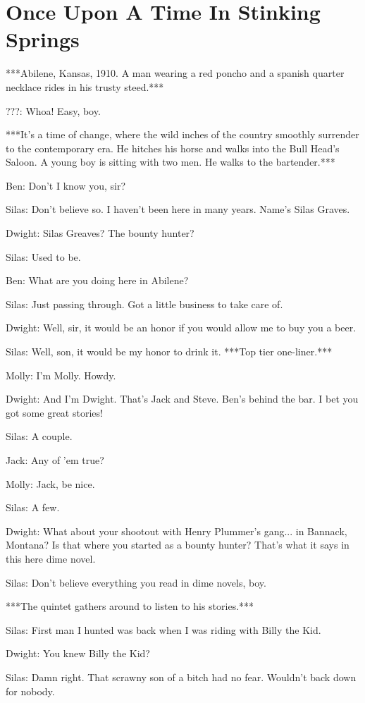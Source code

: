 \documentclass{article}
\begin{document}
\section*{Once Upon A Time In Stinking Springs}

***Abilene, Kansas, 1910. A man wearing a red poncho and a spanish quarter necklace rides in his trusty steed.***

???: Whoa! Easy, boy.

***It's a time of change, where the wild inches of the country smoothly surrender to the contemporary era. He hitches his horse and walks into the Bull Head's Saloon. A young boy is sitting with two men. He walks to the bartender.***

Ben: Don't I know you, sir?

Silas: Don't believe so. I haven't been here in many years. Name's Silas Graves.

Dwight: Silas Greaves? The bounty hunter?

Silas: Used to be.

Ben: What are you doing here in Abilene?

Silas: Just passing through. Got a little business to take care of.

Dwight: Well, sir, it would be an honor if you would allow me to buy you a beer.

Silas: Well, son, it would be my honor to drink it. ***Top tier one-liner.***

Molly: I'm Molly. Howdy.

Dwight: And I'm Dwight. That's Jack and Steve. Ben's behind the bar. I bet you got some great stories!

Silas: A couple.

Jack: Any of 'em true?

Molly: Jack, be nice.

Silas: A few.

Dwight: What about your shootout with Henry Plummer's gang... in Bannack, Montana? Is that where you started as a bounty hunter? That's what it says in this here dime novel.

Silas: Don't believe everything you read in dime novels, boy.

***The quintet gathers around to listen to his stories.***

Silas: First man I hunted was back when I was riding with Billy the Kid.

Dwight: You knew Billy the Kid?

Silas: Damn right. That scrawny son of a bitch had no fear. Wouldn't back down for nobody.
\end{document}
